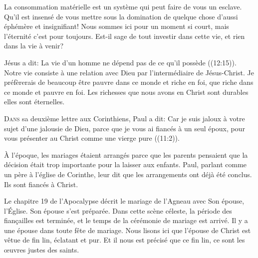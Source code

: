 
La consommation matérielle est un système qui peut faire de vous un esclave.
 Qu'il est insensé de vous mettre sous la domination de quelque chose
 d'aussi éphémère et insignifiant!
 Nous sommes ici pour un moment si court, mais l'éternité c'est pour toujours.
 Est-il sage de tout investir dans cette vie, et rien dans la vie à venir?

Jésus a dit: 
 \Og La vie d'un homme ne dépend pas de ce qu'il possède \Fg{}
 ((12:15)).
 Notre vie consiste à une relation avec Dieu par l'intermédiaire
 de Jésus-Christ. Je préfèrerais de beaucoup être pauvre dans ce monde
 et riche en foi, que riche dans ce monde et pauvre en foi.
 Les richesses que nous avons en Christ sont durables
 \ocadr elles sont éternelles.

\dvrule






\lettrine{D}{ans} sa deuxième lettre aux Corinthiens,
 Paul a dit: 
 \Og Car je suis jaloux à votre sujet d'une jalousie de Dieu,
 parce que je vous ai fiancés à un seul époux,
 pour vous présenter au Christ comme une vierge pure \Fg{}
 ((11:2)). 

À l'époque, les mariages étaient arrangés parce que les parents
 pensaient que la décision était trop importante pour la laisser aux enfants.
 Paul, parlant comme un père à l'église de Corinthe,
 leur dit que les arrangements ont déjà été conclus.
 Ils sont fiancés à Christ. 

Le chapitre 19 de l'Apocalypse décrit le mariage de l'Agneau avec Son épouse,
 l'Église. 
 \Og Son épouse s'est préparée. \Fg{} 
 Dans cette scène céleste, la période des fian\c{c}ailles est terminée,
 et le temps de la cérémonie de mariage est arrivé.
 Il y a une épouse dans toute fête de mariage.
 Nous lisons ici que l'épouse de Christ est \Og vêtue de fin lin,
 éclatant et pur. \Fg{} 
 Et il nous est précisé que ce fin lin, ce sont
 \Og les \oe{}uvres justes des saints. \Fg{}  

